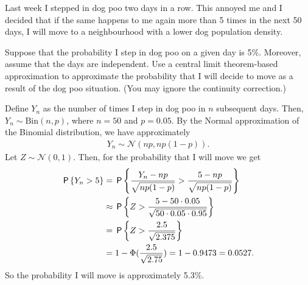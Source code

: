 \documentclass[lectures-questions]{subfiles}
\begin{document}
Last week I stepped in dog poo two days in a row. This annoyed me and I decided that if the same happens to me again more than 5 times in the next 50 days, I will move to a neighbourhood with a lower dog population density.

\begin{exercise}
Suppose that the probability I step in dog poo on a given day is 5\%. Moreover, assume that the days are independent. Use a central limit theorem-based approximation to approximate the probability that I will decide to move as a result of the dog poo situation. (You may ignore the continuity correction.)
\begin{solution}
Define $Y_n$ as the number of times I step in dog poo in $n$ subsequent days. Then, $Y_n \sim \text{Bin}(n, p)$, where $n=50$ and $p = 0.05$. By the Normal approximation of the Binomial distribution, we have approximately
\begin{align}
    Y_n \sim \mathcal{N}(np, np(1-p)).
\end{align}
Let $Z \sim \mathcal{N}(0,1)$. Then, for the probability that I will move we get
\begin{align}
    \P{Y_n > 5} &= \P{\frac{Y_n - np}{\sqrt{np(1-p)}} > \frac{5 - np}{\sqrt{np(1-p)}} } \\
    &\approx \P{Z > \frac{5 - 50\cdot 0.05}{\sqrt{50 \cdot 0.05 \cdot 0.95}} } \\
    &= \P{Z > \frac{2.5}{\sqrt{2.375}} } \\
    &= 1 - \Phi(\frac{2.5}{\sqrt{2.75}}) =  1 - 0.9473 = 0.0527.
\end{align}
So the probability I will move is approximately 5.3\%.
\end{solution}
\end{exercise}
\end{document}
